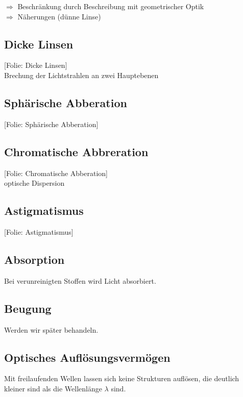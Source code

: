 \documentclass[titlepage,11pt,a4paper,ngerman]{report}
\newcommand{\folie}[1]{\color{gray}[Folie: #1]\color{black}}
\newcommand{\lcom}[1]{\color{MidnightBlue}#1\color{black}}
\newcommand{\rbox}[1]{\begin{tcolorbox}[colback=white,colframe=red!75!black]#1\end{tcolorbox}}
\begin{document}
$ \Rightarrow $ Beschränkung durch Beschreibung mit geometrischer Optik\\
$ \Rightarrow $ Näherungen (dünne Linse)

\subsection{Dicke Linsen}

\folie{Dicke Linsen}\\
Brechung der Lichtstrahlen an zwei Hauptebenen





\subsection{Sphärische Abberation}

\folie{Sphärische Abberation}

\subsection{Chromatische Abbreration}

\folie{Chromatische Abberation}\\
optische Dispersion

\subsection{Astigmatismus}

\folie{Astigmatismus}

\subsection{Absorption}

Bei verunreinigten Stoffen wird Licht absorbiert.

\subsection{Beugung}

\lcom{Werden wir später behandeln.}

\subsection{Optisches Auflösungsvermögen}

\rbox{Mit freilaufenden Wellen lassen sich keine Strukturen auflösen, die deutlich kleiner sind als die Wellenlänge $ \lambda $ sind.}
\end{document}

